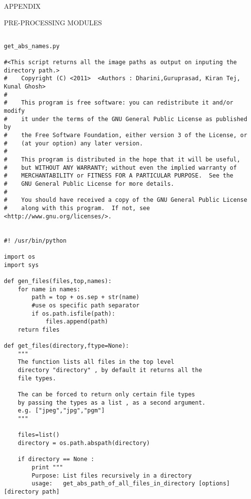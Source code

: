\documentclass[10pt,a4paper]{article}
\begin{document}
\begin{center}\textup{\Large APPENDIX }\\[1.0cm] 
\end{center}
\begin{flushleft}

\textup{\Large PRE-PROCESSING MODULES} \\[0.5cm]


\end{flushleft}

\begin{lstlisting}

get_abs_names.py

#<This script returns all the image paths as output on inputing the directory path.>
#    Copyright (C) <2011>  <Authors : Dharini,Guruprasad, Kiran Tej, Kunal Ghosh>
#
#    This program is free software: you can redistribute it and/or modify
#    it under the terms of the GNU General Public License as published by
#    the Free Software Foundation, either version 3 of the License, or
#    (at your option) any later version.
#
#    This program is distributed in the hope that it will be useful,
#    but WITHOUT ANY WARRANTY; without even the implied warranty of
#    MERCHANTABILITY or FITNESS FOR A PARTICULAR PURPOSE.  See the
#    GNU General Public License for more details.
#
#    You should have received a copy of the GNU General Public License
#    along with this program.  If not, see <http://www.gnu.org/licenses/>.


#! /usr/bin/python

import os
import sys

def gen_files(files,top,names):
    for name in names:
        path = top + os.sep + str(name)
        #use os specific path separator
        if os.path.isfile(path):
            files.append(path)
    return files

def get_files(directory,ftype=None):
    """
    The function lists all files in the top level
    directory "directory" , by default it returns all the
    file types.

    The can be forced to return only certain file types
    by passing the types as a list , as a second argument.
    e.g. ["jpeg","jpg","pgm"] 
    """

    files=list()
    directory = os.path.abspath(directory)
    
    if directory == None :
        print """
        Purpose: List files recursively in a directory
        usage:   get_abs_path_of_all_files_in_directory [options] [directory path]


\end{lstlisting}
\end{document}
